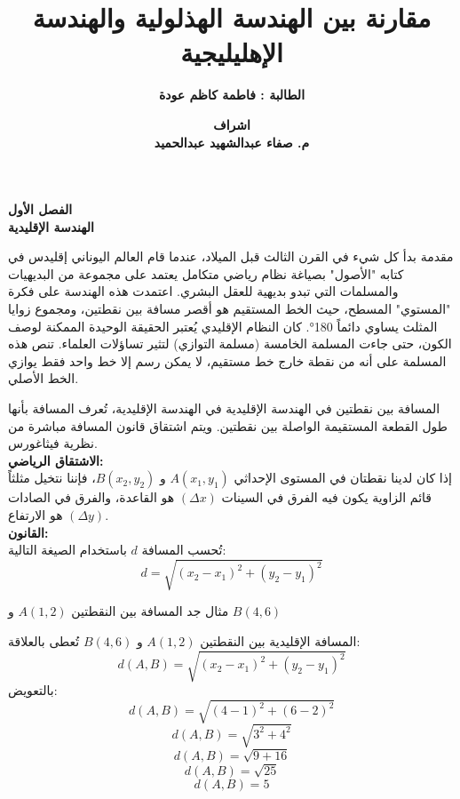 



	\author{\textbf{الطالبة : فاطمة كاظم عودة}}
	\title{\textbf{مقارنة بين الهندسة الهذلولية والهندسة الإهليليجية}}
	\date{\textbf{اشراف\\
			 م. صفاء عبدالشهيد عبدالحميد}}
	
		
		\begin{frame}
			\maketitle
		\end{frame}
		
		\begin{frame}
			\begin{center}
				\Huge
				\textbf{الفصل الأول}\\
				\textbf{الهندسة الإقليدية}
			\end{center}
		\end{frame}
		
		\begin{frame}{مقدمة}
			بدأ كل شيء في القرن الثالث قبل الميلاد، عندما قام العالم اليوناني إقليدس في كتابه "الأصول" بصياغة نظام رياضي متكامل يعتمد على مجموعة من البديهيات والمسلمات التي تبدو بديهية للعقل البشري. اعتمدت هذه الهندسة على فكرة "المستوي" المسطح، حيث الخط المستقيم هو أقصر مسافة بين نقطتين، ومجموع زوايا المثلث يساوي دائماً 180°.
			كان النظام الإقليدي يُعتبر الحقيقة الوحيدة الممكنة لوصف الكون، حتى جاءت المسلمة الخامسة (مسلمة التوازي) لتثير تساؤلات العلماء. تنص هذه المسلمة على أنه من نقطة خارج خط مستقيم، لا يمكن رسم إلا خط واحد فقط يوازي الخط الأصلي.
		\end{frame}
		
		\begin{frame}{المسافة بين نقطتين في الهندسة الإقليدية}
			في الهندسة الإقليدية، تُعرف المسافة بأنها طول القطعة المستقيمة الواصلة بين نقطتين. ويتم اشتقاق قانون المسافة مباشرة من نظرية فيثاغورس.\\
			\textbf{الاشتقاق الرياضي:}\\
			إذا كان لدينا نقطتان في المستوى الإحداثي $A(x_1, y_1)$ و $B(x_2, y_2)$، فإننا نتخيل مثلثاً قائم الزاوية يكون فيه الفرق في السينات $(\Delta x)$ هو القاعدة، والفرق في الصادات $(\Delta y)$ هو الارتفاع.\\
			\textbf{القانون:}\\
			تُحسب المسافة $d$ باستخدام الصيغة التالية:
			\[
			d = \sqrt{(x_2 - x_1)^2 + (y_2 - y_1)^2}
			\]
		\end{frame}
		\begin{frame}
			\begin{exampleblock}{مثال}
				جد المسافة بين النقطتين
				$A(1, 2)$ و $B(4, 6)$
			\end{exampleblock}
				المسافة الإقليدية بين النقطتين $A(1,2)$ و $B(4,6)$ تُعطى بالعلاقة:
				\[
				d(A,B)=\sqrt{(x_2-x_1)^2+(y_2-y_1)^2}
				\]
				بالتعويض:
				\[
				d(A,B)=\sqrt{(4-1)^2+(6-2)^2}
				\]
				\[
				d(A,B)=\sqrt{3^2+4^2}
				\]
				\[
				d(A,B)=\sqrt{9+16}
				\]
				\[
				d(A,B)=\sqrt{25}
				\]
				\[
				d(A,B)=5
				\]
		\end{frame}
		
